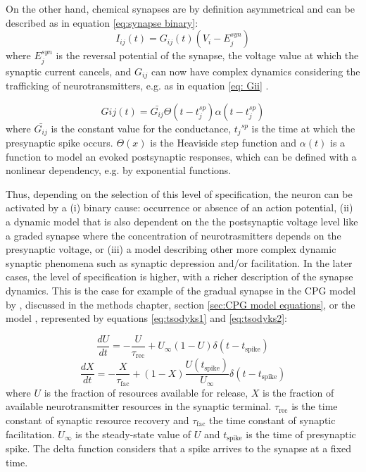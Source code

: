 On the other hand, chemical synapses are by definition asymmetrical and can be described as in equation \ref{eq:synapse binary}:
\begin{equation}
     I_{ij}(t) = G_{ij}(t) (V_i - E_j^{syn})
     \label{eq:synapse binary}
\end{equation}
\noindent where $E_j^{syn}$ is the reversal potential of the synapse, the voltage value at which the synaptic current cancels, and $G_{ij}$ can now have complex dynamics considering the trafficking of neurotransmitters, e.g. as in equation \ref{eq: Gii} \parencite{torres_modeling_2012}. 

\begin{equation}
	G{ij}(t) = \bar{G_{ij}}  \Theta(t-t_j^{sp}) \alpha (t-t_j^{sp})
	\label{eq: Gii}
\end{equation}
\noindent where $\bar{G_{ij}}$ is the constant value for the conductance, ${t_j}^{sp}$ is the time at which the presynaptic spike occurs. $\Theta(x)$ is the Heaviside step function and $\alpha(t)$ is a function to model an evoked postsynaptic responses, which can be defined with a nonlinear dependency, e.g. by exponential functions.

Thus, depending on the selection of this level of specification, the neuron can be activated by a (i) binary cause: occurrence or absence of an action potential,  (ii) a dynamic model that is also dependent on the the postsynaptic voltage level like a graded synapse where the concentration of neurotrasmitters depends on the presynaptic voltage, or (iii) a model describing  other more complex dynamic synaptic phenomena such as synaptic depression and/or facilitation. In the later cases, the level of specification is higher, with a richer description of the synapse dynamics. This is the case for example of the gradual synapse in the CPG model by \textcite{vavoulis_dynamic_2007}, discussed in the methods chapter, section \ref{sec:CPG model equations}, or the \textcite{tsodyks_neural_1997} model , represented by equations \ref{eq:tsodyks1} and \ref{eq:tsodyks2}:


\begin{equation}
	\frac{dU}{dt} = -\frac{U}{\tau_{\text{rec}}} + U_{\infty}(1 - U) \delta(t - t_{\text{spike}})
	\label{eq:tsodyks1}
\end{equation}
\begin{equation}
	\frac{dX}{dt} = -\frac{X}{\tau_{\text{fac}}} + (1 - X) \frac{U(t_{\text{spike}})}{U_{\infty}} \delta(t - t_{\text{spike}})
	\label{eq:tsodyks2}
\end{equation}
\noindent where $U$ is the fraction of resources available for release, $X$ is the fraction of available neurotransmitter resources in the synaptic terminal. $\tau_\text{rec}$ is the time constant of synaptic resource recovery and $\tau_\text{fac}$ the time constant of synaptic facilitation. $U_\infty$ is the steady-state value of $U$ and $t_{\text{spike}}$ is the time of presynaptic spike. The delta function considers that a spike arrives to the synapse at a fixed time. 


